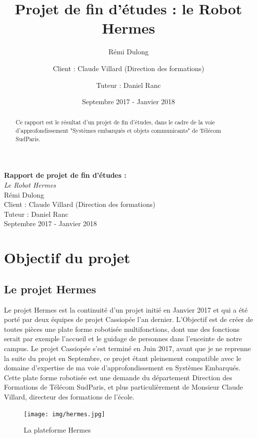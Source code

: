 \documentclass{report}
\title{Projet de fin d'études : le Robot Hermes}
\author{Rémi Dulong \and{Client : Claude Villard (Direction des formations)}
\and{Tuteur : Daniel Ranc}}
\date{Septembre 2017 - Janvier 2018}
\begin{document}
\begin{titlepage}
  \centering
  \vfill
  {\bfseries \Huge
      Rapport de projet de fin d'études : \\
  }
  {\huge
      \textit{Le Robot Hermes}\\
      Rémi Dulong\\
      Client : Claude Villard (Direction des formations)\\
      Tuteur : Daniel Ranc\\
      \vskip2cm
      Septembre 2017 - Janvier 2018\\
  }
  \vfill

  \vfill
  \vfill
\end{titlepage}

  \newpage

  \begin{abstract}
      {Ce rapport est le résultat d'un projet de fin d'études, dans le cadre de
       la voie d'approfondissement "Systèmes embarqués et objets communicants"
       de Télécom SudParis.}
  \end{abstract}

  \tableofcontents
  \newpage

\chapter{Objectif du projet}

  \section{Le projet Hermes}

    {Le projet Hermes est la continuité d'un projet initié en Janvier 2017 et
    qui a été porté par deux équipes de projet Cassiopée l'an dernier. L'Objectif
    est de créer de toutes pièces une plate forme robotisée multifonctions, dont
    une des fonctions serait par exemple l'accueil et le guidage de personnes dans
    l'enceinte de notre campus. Le projet Cassiopée s'est terminé en Juin 2017,
    avant que je ne reprenne la suite du projet en Septembre, ce projet étant pleinement
    compatible avec le domaine d'expertise de ma voie d'approfondissement en
    Systèmes Embarqués. Cette plate forme robotisée est une demande du département
    Direction des Formations de Télécom SudParis, et plus particulièrement de
    Monsieur Claude Villard, directeur des formations de l'école.}

    \begin{figure}
      \texttt{[image: img/hermes.jpg]}
      \caption{La plateforme Hermes}
    \end{figure}
\end{document}
